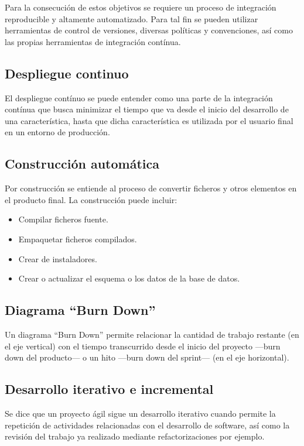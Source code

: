 Para la consecución de estos objetivos se requiere un proceso de integración reproducible y altamente automatizado. Para tal fin se pueden utilizar herramientas de control de versiones, diversas políticas y convenciones, así como las propias herramientas de integración contínua.

\subsection{Despliegue continuo}

El despliegue contínuo se puede entender como una parte de la integración contínua que busca minimizar el tiempo que va desde el inicio del desarrollo de una característica, hasta que dicha característica es utilizada por el usuario final en un entorno de producción.

\subsection{Construcción automática}

Por construcción se entiende al proceso de convertir ficheros y otros elementos en el producto final. La construcción puede incluir:

\begin{itemize}
	\item Compilar ficheros fuente.
	\item Empaquetar ficheros compilados.
	\item Crear de instaladores.
	\item Crear o actualizar el esquema o los datos de la base de datos.
\end{itemize}

\subsection{Diagrama ``Burn Down''}

Un diagrama ``Burn Down'' permite relacionar la cantidad de trabajo restante (en el eje vertical) con el tiempo transcurrido desde el inicio del proyecto —burn down del producto— o un hito —burn down del sprint— (en el eje horizontal).

\subsection{Desarrollo iterativo e incremental}

Se dice que un proyecto ágil sigue un desarrollo iterativo cuando permite la repetición de actividades relacionadas con el desarrollo de software, así como la revisión del trabajo ya realizado mediante refactorizaciones por ejemplo.

